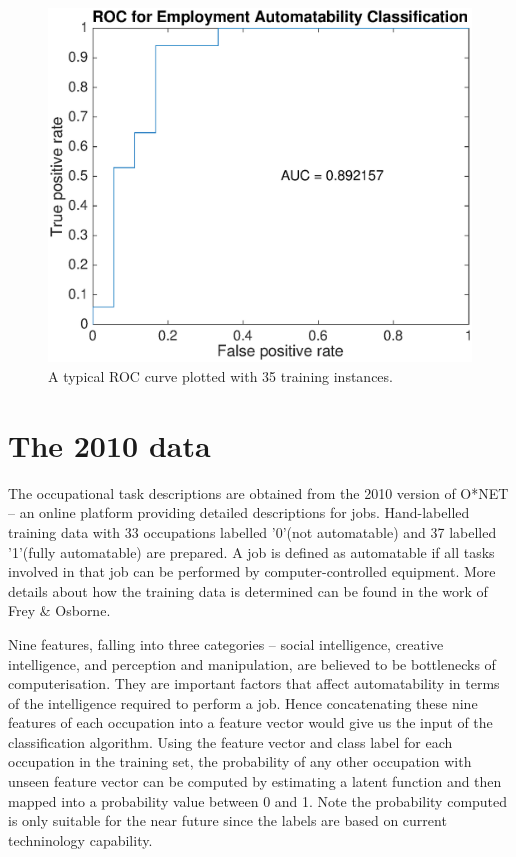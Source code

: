 \documentclass[11pt]{report}
\numberwithin{equation}{chapter}
\begin{document}
\begin{spacing}{2}
\begin{figure}[!htb]
\centering
\includegraphics[scale=0.5]{ROC1.eps}
\caption{A typical ROC curve plotted with 35 training instances. }
\label{fig:ROC}
\end{figure}



\newpage
\section{The 2010 data}%
The occupational task descriptions are obtained from the 2010 version of O*NET -- an online platform providing detailed descriptions for jobs. Hand-labelled training data with 33 occupations labelled '0'(not automatable) and 37 labelled '1'(fully automatable) are prepared. A job is defined as automatable if all tasks involved in that job can be performed by computer-controlled equipment. More details about how the training data is determined can be found in the work of Frey \& Osborne\cite{frey2013future}.  

Nine features, falling into three categories -- social intelligence, creative intelligence, and perception and manipulation, are believed to be bottlenecks of computerisation. They  are important factors that affect automatability in terms of the intelligence required to perform a job. Hence concatenating these nine features of each occupation into a feature vector would give us the input of the classification algorithm. Using the feature vector and class label for each occupation in the training set, the probability of any other occupation with unseen feature vector can be computed by estimating a latent function and then mapped into a probability value between 0 and 1. Note the probability computed is only suitable for the near future since the labels are based on current techninology capability.


\end{spacing}
\end{document}
